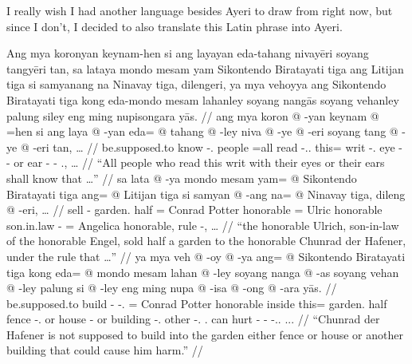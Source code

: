 \documentclass[12pt,paper=a4]{scrartcl}
\begin{document}
I really wish I had another language besides Ayeri to draw from right now, but 
since I don't, I decided to also translate this Latin phrase into Ayeri.


\pex
	\glpreamble Ang mya koronyan keynam-hen si ang layayan eda-tahang 
		nivayēri soyang tangyēri tan, sa lataya mondo mesam yam 
		Sikontendo Biratayati tiga ang Litijan tiga si samyanang na 
		Ninavay tiga, dilengeri, ya mya vehoyya ang Sikontendo 
		Biratayati tiga kong eda-mondo mesam lahanley soyang nangās 
		soyang vehanley palung siley eng ming nupisongara yās. //
	\a \begingl
		\gla ang mya koron @ -yan keynam @ =hen si ang laya @ -yan eda= 
		@ tahang @ -ley niva @ -ye @ -eri soyang tang @ -ye @ -eri tan, 
		… //
		\glb \AgtT{} be.supposed.to know -\Tpl{}.\M{} people =all \Rel{} 
			\AgtT{} read -\Tpl{}.\M{}.\Top{} this= writ 
			-\Parg{}.\Inan{} eye -\Pl{} -\Ins{} or ear -\Pl{} 
			-\Ins{} \Tpl{}.\Gen{}, … //
		\glft \enquote{All people who read this writ with their eyes or 
			their ears shall know that …} //
	\endgl
	\a \begingl
		\gla sa lata @ -ya mondo mesam yam= @ Sikontendo Biratayati tiga 
			ang= @ Litijan tiga si samyan @ -ang na= @ Ninavay tiga, 
			dileng @ -eri, … //
		\glb \PatT{} sell -\Tsg{} garden.\Top{} half \Dat{}= Conrad 
			Potter honorable \Aarg{}= Ulric honorable \Rel{} 
			son.in.law -\Aarg{} \Gen{}= Angelica honorable, rule 
			-\Ins{}, … //
		\glft \enquote{the honorable Ulrich, son-in-law of the honorable 
			Engel, sold half a garden to the honorable Chunrad der 
			Hafener, under the rule that …} //
	\endgl
	\a \begingl
		\gla ya mya veh @ -oy @ -ya ang= @ Sikontendo Biratayati tiga 
			kong eda= @ mondo mesam lahan @ -ley soyang nanga @ -as 
			soyang vehan @ -ley palung si @ -ley eng ming nupa @ 
			-isa @ -ong @ -ara yās. //
		\glb \LocT{} be.supposed.to build -\Neg{} -\Tsg{}.\M{} \Aarg{}= 
			Conrad Potter honorable inside this= garden.\Top{} half 
			fence -\Parg{}.\Inan{} or house -\Parg{} or building 
			-\Parg{}.\Inan{} other \Rel{} -\Parg{}.\Inan{} 
			\AgtT{}.\Inan{} can hurt -\Caus{} -\Irr{} 
			-\Tsg{}.\Inan{}.\Top{} \Tsg{}.\M{}.\Parg{}. //
		\glft \enquote{Chunrad der Hafener is not supposed to build into 
		the garden either fence or house or another building that could 
		cause him harm.} //
	\endgl
\xe
\end{document}
